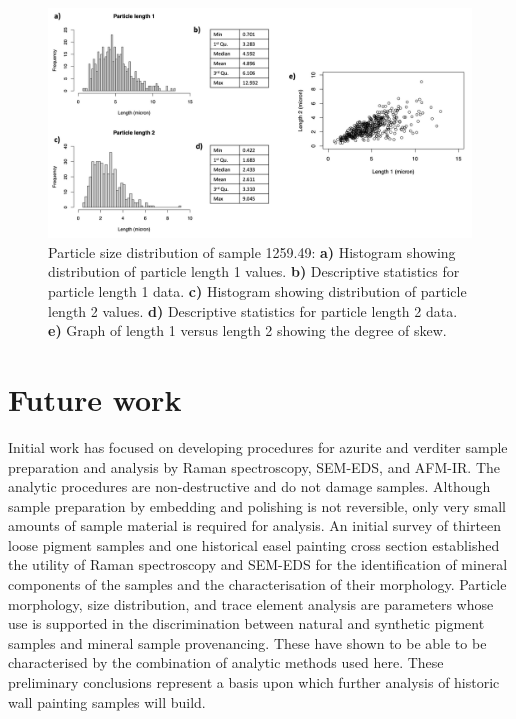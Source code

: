 \begin{figure}[H]
\centering
  \includegraphics[width=0.8\linewidth]{1259.49_partsize}
\caption[Particle size distribution, sample 1259.49.]{Particle size distribution of sample 1259.49: \textbf{a)} Histogram showing distribution of particle length 1 values. \textbf{b)} Descriptive statistics for particle length 1 data. \textbf{c)} Histogram showing distribution of particle length 2 values. \textbf{d)} Descriptive statistics for particle length 2 data. \textbf{e)} Graph of length 1 versus length 2 showing the degree of skew.}
\label{fig:1259.49_partsize}
\end{figure}









\chapter{Future work} %

Initial work has focused on developing procedures for azurite and verditer sample preparation and analysis by Raman spectroscopy, SEM-EDS, and AFM-IR. The analytic procedures are non-destructive and do not damage samples. Although sample preparation by embedding and polishing is not reversible, only very small amounts of sample material is required for analysis. An initial survey of thirteen loose pigment samples and one historical easel painting cross section established the utility of Raman spectroscopy and SEM-EDS for the identification of mineral components of the samples and the characterisation of their morphology. Particle morphology, size distribution, and trace element analysis are parameters whose use is supported in the discrimination between natural and synthetic pigment samples and mineral sample provenancing. These have shown to be able to be characterised by the combination of analytic methods used here. These preliminary conclusions represent a basis upon which further analysis of historic wall painting samples will build.

